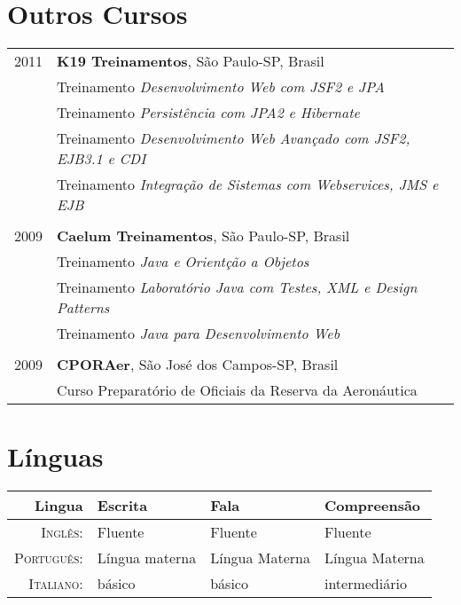 \documentclass[a4paper,10pt]{article} %
\begin{document}
\section{Outros Cursos}

\begin{tabular}{r|p{11cm}}

2011 & \textbf{K19 Treinamentos}, S\~ao Paulo-SP, Brasil\\
    & \footnotesize{Treinamento \emph{Desenvolvimento Web com JSF2 e JPA}}\\
    & \footnotesize{Treinamento \emph{Persist\^{e}ncia com JPA2 e Hibernate}}\\
    & \footnotesize{Treinamento \emph{Desenvolvimento Web Avançado com JSF2, EJB3.1 e CDI}}\\
    & \footnotesize{Treinamento \emph{Integração de Sistemas com Webservices, JMS e EJB}}\\
    \multicolumn{2}{c}{} \\

2009 & \textbf{Caelum Treinamentos}, S\~{a}o Paulo-SP, Brasil\\
    & \footnotesize{Treinamento \emph{Java e Orientção a Objetos}}\\
    & \footnotesize{Treinamento \emph{Laboratório Java com Testes, XML e Design Patterns}}\\
    & \footnotesize{Treinamento \emph{Java para Desenvolvimento Web}}\\
    \multicolumn{2}{c}{} \\

2009 & \textbf{CPORAer}, São José dos Campos-SP, Brasil\\
    & \footnotesize{Curso Preparatório de Oficiais da Reserva da Aeronáutica}\\

\end{tabular}


\section{Línguas}

\begin{tabular}{r|lll}
Lingua & Escrita & Fala & Compreensão \\
\hline
\textsc{Inglês:} & Fluente & Fluente & Fluente \\

\textsc{Português:} & Língua materna & Língua Materna & Língua Materna \\

\textsc{Italiano:} & básico & básico & intermediário \\
\end{tabular}
\end{document}
